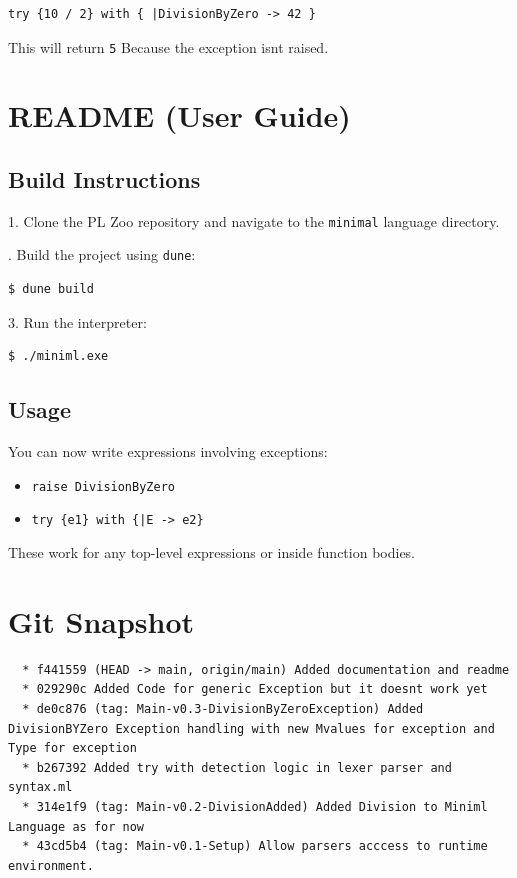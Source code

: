 \documentclass[11pt]{article}
\begin{document}
\begin{lstlisting}
try {10 / 2} with { |DivisionByZero -> 42 }
\end{lstlisting}

This will return \texttt{5} Because the exception isnt raised.

\section{README (User Guide)}

\subsection{Build Instructions}

1. Clone the PL Zoo repository and navigate to the \texttt{minimal} language directory.

. Build the project using \texttt{dune}:
\begin{lstlisting}
$ dune build
\end{lstlisting}

3. Run the interpreter:
\begin{lstlisting}
$ ./miniml.exe
\end{lstlisting}

\subsection{Usage}

You can now write expressions involving exceptions:

\begin{itemize}[itemsep=0.5em]
  \item \texttt{raise DivisionByZero}
  \item \texttt{try \{e1\} with \{|E -> e2\}}
\end{itemize}

These work for any top-level expressions or inside function bodies.

\section{Git Snapshot}

\begin{lstlisting}
  * f441559 (HEAD -> main, origin/main) Added documentation and readme
  * 029290c Added Code for generic Exception but it doesnt work yet
  * de0c876 (tag: Main-v0.3-DivisionByZeroException) Added DivisionBYZero Exception handling with new Mvalues for exception and Type for exception
  * b267392 Added try with detection logic in lexer parser and syntax.ml
  * 314e1f9 (tag: Main-v0.2-DivisionAdded) Added Division to Miniml Language as for now
  * 43cd5b4 (tag: Main-v0.1-Setup) Allow parsers acccess to runtime environment.
\end{lstlisting}
\end{document}
